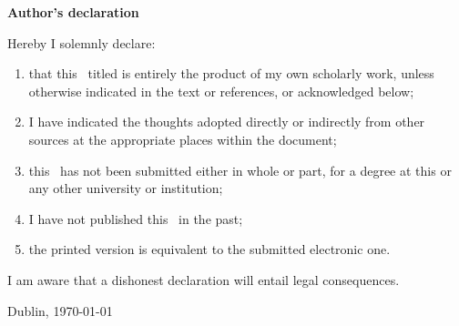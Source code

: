 \clearpage
\thispagestyle{empty}

{\LARGE\textsf{\textbf{ Author’s declaration}}}


Hereby I solemnly declare:
\begin{enumerate}
    \item that this \typMeinerArbeit\, titled \emph{\themaMeinerArbeit} is entirely the product of my own scholarly work, unless otherwise
    indicated in the text or references, or acknowledged below;

    \item I have indicated the thoughts adopted directly or indirectly from other sources at
    the appropriate places within the document;

    \item this \typMeinerArbeit\ has not been submitted either in whole or
    part, for a degree at this or any other university or institution;

    \item  I have not published this \typMeinerArbeit\ in the past;

    \item the printed version is equivalent to the submitted electronic one.
\end{enumerate}
I am aware that a dishonest declaration will entail legal consequences.


\vspace{2cm}

Dublin, \today

